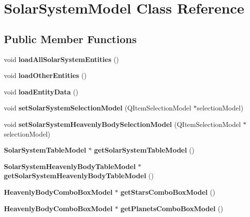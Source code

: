 \section{\-Solar\-System\-Model \-Class \-Reference}
\label{db/da1/classSolarSystemModel}
\subsection*{\-Public \-Member \-Functions}
\begin{DoxyCompactItemize}
\item 
void {\bfseries load\-All\-Solar\-System\-Entities} ()\label{db/da1/classSolarSystemModel_a56492416712dfd3a2fd22dc211258393}

\item 
void {\bfseries load\-Other\-Entities} ()\label{db/da1/classSolarSystemModel_a0d8ae9f49753e347f8eef4e0c7153872}

\item 
void {\bfseries load\-Entity\-Data} ()\label{db/da1/classSolarSystemModel_a4d83bccf2fd4daa156ac2d71b0adbfcd}

\item 
void {\bfseries set\-Solar\-System\-Selection\-Model} (\-Q\-Item\-Selection\-Model $\ast$selection\-Model)\label{db/da1/classSolarSystemModel_ac8d3b318c5820a6fb085418312eb9eff}

\item 
void {\bfseries set\-Solar\-System\-Heavenly\-Body\-Selection\-Model} (\-Q\-Item\-Selection\-Model $\ast$selection\-Model)\label{db/da1/classSolarSystemModel_a9541609daeebde3d067b6a6d9a13e629}

\item 
{\bf \-Solar\-System\-Table\-Model} $\ast$ {\bfseries get\-Solar\-System\-Table\-Model} ()\label{db/da1/classSolarSystemModel_a251c5220ac938e8d44e0093606305dea}

\item 
{\bf \-Solar\-System\-Heavenly\-Body\-Table\-Model} $\ast$ {\bfseries get\-Solar\-System\-Heavenly\-Body\-Table\-Model} ()\label{db/da1/classSolarSystemModel_a8086ca6a1d7fa3696ffaa95297d9892d}

\item 
{\bf \-Heavenly\-Body\-Combo\-Box\-Model} $\ast$ {\bfseries get\-Stars\-Combo\-Box\-Model} ()\label{db/da1/classSolarSystemModel_a6e84376f02312034a70b4d93a93bc965}

\item 
{\bf \-Heavenly\-Body\-Combo\-Box\-Model} $\ast$ {\bfseries get\-Planets\-Combo\-Box\-Model} ()\label{db/da1/classSolarSystemModel_aa807bdf5d621b64ef8752349404737d5}


\end{DoxyCompactItemize}
